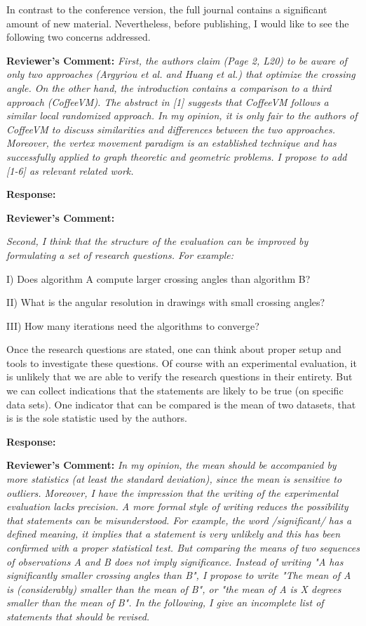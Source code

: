 \documentclass{article}
\newcommand{\tcomment}[1]{\vspace{0.3cm} {\color{red} \item \textbf{Reviewer's Comment:} {\em #1}}}
\newcommand{\response}{\vspace{0.2cm} \textbf{Response: }}
\begin{document}
In contrast to the conference version, the full journal contains a significant amount of new material. Nevertheless, before publishing, I would like to see the following two concerns addressed.

\begin{itemize}
\tcomment{First, the authors claim (Page 2, L20) to be aware of only two approaches (Argyriou et al. and Huang et al.) that optimize the crossing angle. On the other hand, the introduction contains a comparison to a third approach (CoffeeVM). The abstract in [1] suggests that CoffeeVM follows a similar local randomized approach. In my opinion, it is only fair to the authors of CoffeeVM to discuss similarities and differences between the two approaches.  Moreover, the vertex movement paradigm is an established technique and has successfully applied to graph theoretic and geometric problems. I propose to add [1-6] as relevant related work.}

\response{}

\tcomment{Second, I think that the structure of the evaluation can be improved by formulating a set of research questions. For example:

I) Does algorithm A compute larger crossing angles than algorithm B?

II) What is the angular resolution in drawings with small crossing angles?

III) How many iterations need the algorithms to converge?

Once the research questions are stated, one can think about proper setup and tools to investigate these questions. Of course with an experimental evaluation, it is unlikely that we are able to verify the research questions in their entirety. But we can collect indications that the statements are likely to be true (on specific data sets). One indicator that can be compared is the mean of two datasets, that is is the sole statistic used by the authors. }

\response{}

\tcomment{In my opinion, the mean should be accompanied by more statistics (at least the standard deviation), since the mean is sensitive to outliers. Moreover, I have the impression that the writing of the experimental evaluation lacks precision. A more formal style of writing reduces the possibility that statements can be misunderstood.
For example, the word /significant/ has a defined meaning, it implies that a statement is very unlikely and this has been confirmed with a proper statistical test. But comparing the means of two sequences of observations A and B does not imply significance. Instead of writing "A has significantly smaller crossing angles than B", I propose to write "The mean of A is (considerably) smaller than the mean of B", or "the mean of A is X degrees smaller than the mean of B". In the following, I give an incomplete list of statements that should be revised.}


\end{itemize}
\end{document}
